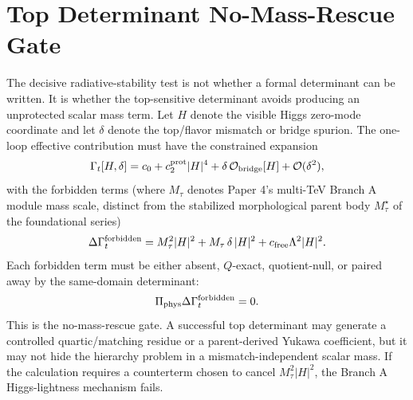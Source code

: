 \documentclass[11pt]{article}
\begin{document}
\section{Top Determinant No-Mass-Rescue Gate}
The decisive radiative-stability test is not whether a formal determinant can
be written.  It is whether the top-sensitive determinant avoids producing an
unprotected scalar mass term.  Let $H$ denote the visible Higgs zero-mode
coordinate and let $\delta$ denote the top/flavor mismatch or bridge spurion.
The one-loop effective contribution must have the constrained expansion
\begin{equation}
\Gamma_t[H,\delta]
=
c_0+c_2^{\rm prot}|H|^4
+\delta\,{\cal O}_{\rm bridge}[H]
+{\cal O}(\delta^2),
\end{equation}
with the forbidden terms (where $M_\tau$ denotes Paper 4's multi-TeV Branch A module mass scale, distinct from the stabilized morphological parent body $M_\tau^\star$ of the foundational series)
\begin{equation}
\Delta\Gamma_t^{\rm forbidden}
=
M_\tau^2 |H|^2
+M_\tau\,\delta\,|H|^2
+c_{\rm free}\Lambda^2|H|^2 .
\end{equation}
Each forbidden term must be either absent, $Q$-exact, quotient-null, or paired
away by the same-domain determinant:
\begin{equation}
\Pi_{\rm phys}\Delta\Gamma_t^{\rm forbidden}=0 .
\end{equation}
This is the no-mass-rescue gate.  A successful top determinant may generate a
controlled quartic/matching residue or a parent-derived Yukawa coefficient, but
it may not hide the hierarchy problem in a mismatch-independent scalar mass.
If the calculation requires a counterterm chosen to cancel
$M_\tau^2|H|^2$, the Branch A Higgs-lightness mechanism fails.
\end{document}
